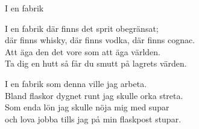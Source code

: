 \begin{song}{I en fabrik}

	
	
	I en fabrik där finns det sprit obegränsat;\\
	där finns whisky, där finns vodka, där finns cognac.\\
	Att äga den det vore som att äga världen.\\
	Ta dig en hutt så får du smutt på lagrets värden.
	
	I en fabrik som denna ville jag arbeta.\\
	Bland flaskor dygnet runt jag skulle orka streta.\\
	Som enda lön jag skulle nöja mig med supar\\
	och lova jobba tills jag på min flaskpost stupar.
	
\end{song}

